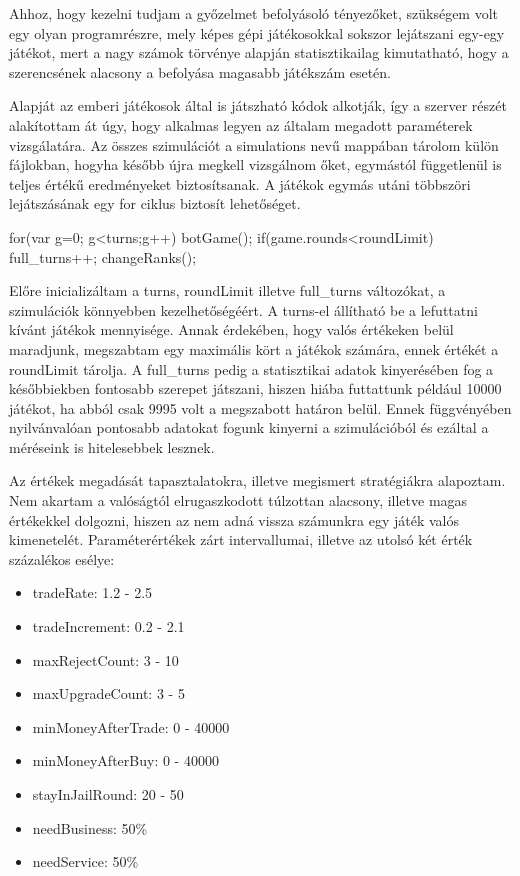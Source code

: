 

Ahhoz, hogy kezelni tudjam a győzelmet befolyásoló tényezőket, szükségem volt egy olyan programrészre, mely képes gépi játékosokkal sokszor lejátszani egy-egy játékot, mert a nagy számok törvénye alapján statisztikailag kimutatható, hogy a szerencsének alacsony a befolyása magasabb játékszám esetén.

	Alapját az emberi játékosok által is játszható kódok alkotják, így a szerver részét alakítottam át úgy, hogy alkalmas legyen az általam megadott paraméterek vizsgálatára. Az összes szimulációt a simulations nevű mappában tárolom külön fájlokban, hogyha később újra megkell vizsgálnom őket, egymástól függetlenül is teljes értékű eredményeket biztosítsanak.  A játékok egymás utáni többszöri lejátszásának egy for ciklus biztosít lehetőséget.

\begin{javascript}
for(var g=0; g<turns;g++){
        botGame();
        if(game.rounds<roundLimit){
            full_turns++;
            changeRanks();
        }
}
\end{javascript}


Előre inicializáltam a turns, roundLimit illetve full\_turns változókat, a szimulációk könnyebben kezelhetőségéért. A turns-el állítható be a lefuttatni kívánt játékok mennyisége. Annak érdekében, hogy valós értékeken belül maradjunk, megszabtam  egy maximális kört a játékok számára, ennek értékét a roundLimit tárolja. A full\_turns pedig a statisztikai adatok kinyerésében fog a későbbiekben fontosabb szerepet játszani, hiszen hiába futtattunk például 10000 játékot, ha abból csak 9995 volt a megszabott határon belül. Ennek függvényében nyilvánvalóan pontosabb adatokat fogunk kinyerni a szimulációból és ezáltal a méréseink is hitelesebbek lesznek.



Az értékek megadását tapasztalatokra, illetve megismert stratégiákra alapoztam. Nem akartam a valóságtól elrugaszkodott túlzottan alacsony, illetve magas értékekkel dolgozni, hiszen az nem adná vissza számunkra egy játék valós kimenetelét. Paraméterértékek zárt intervallumai, illetve az utolsó két érték százalékos esélye:

\begin{itemize}
	\item tradeRate: 1.2 - 2.5
	\item tradeIncrement: 0.2 - 2.1
	\item maxRejectCount: 3 - 10
	\item maxUpgradeCount: 3 - 5
	\item minMoneyAfterTrade: 0 - 40000
	\item minMoneyAfterBuy: 0 - 40000
	\item stayInJailRound: 20 - 50
	\item needBusiness: 50\%
	\item needService: 50\%
\end{itemize}

